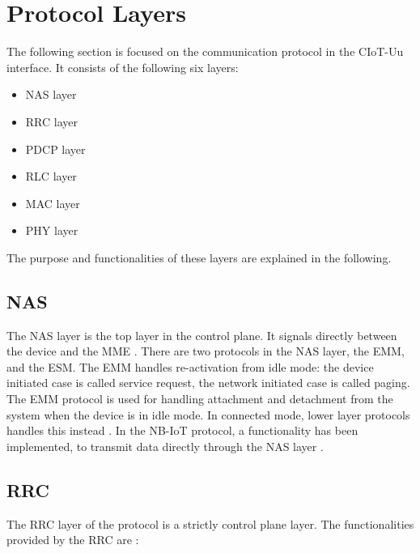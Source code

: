 \section{Protocol Layers}

The following section is focused on the communication protocol in the \gls{CIoT}-Uu interface. It consists of the following six layers:
\begin{itemize}
    \item \gls{NAS} layer
    \item \gls{RRC} layer
    \item \gls{PDCP} layer
    \item \gls{RLC} layer
    \item \gls{MAC} layer
    \item \gls{PHY} layer
\end{itemize}

The purpose and functionalities of these layers are explained in the following.

\subsection{NAS}
The \gls{NAS} layer is the top layer in the control plane. It signals directly between the device and the \gls{MME} \citep[ch. 3]{book_LTE_for_UMTS}. There are two protocols in the \gls{NAS} layer, the \gls{EMM}, and the \gls{ESM}. The \gls{EMM} handles re-activation from idle mode: the device initiated case is called service request, the network initiated case is called paging. The \gls{EMM} protocol is used for handling attachment and detachment from the system when the device is in idle mode. In connected mode, lower layer protocols handles this instead \citep[ch. 3]{book_LTE_for_UMTS}. In the NB-IoT protocol, a functionality has been implemented, to transmit data directly through the NAS layer \citep{REL-13}. 

\subsection{RRC} \label{sec:RRC}
The \gls{RRC} layer of the protocol is a strictly control plane layer. The functionalities provided by the \gls{RRC} are \citep[ch. 6.6]{book_LTE_for_UMTS}:

